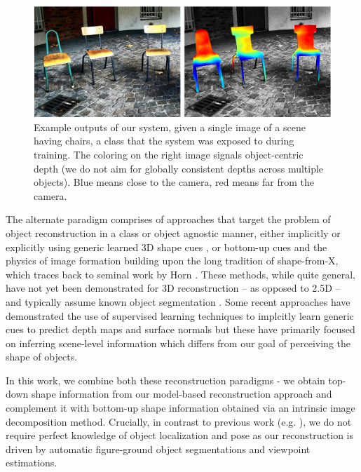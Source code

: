 \begin{figure}[t]
\includegraphics[width = \textwidth]{figures/categoryshapes/teaserChair.pdf}
\caption{Example outputs of our system, given a single image of a scene having chairs, a class that the system was exposed to during training. The coloring on the right image signals object-centric depth (we do not aim for globally consistent depths across multiple objects). Blue means close to the camera, red means far from the camera.}
\end{figure}

The alternate paradigm comprises of approaches that target the problem of object reconstruction in a class or object agnostic manner, either implicitly or explicitly using generic learned 3D shape cues \cite{hoiem2005automatic, saxena2009make3d}, or bottom-up cues and the physics of image formation \cite{Karsch2013,barronPAMI13} building upon the long tradition of shape-from-X, which traces back to seminal work by Horn \cite{HORNThesis1970}. These methods, while quite general, have not yet been demonstrated for 3D reconstruction -- as opposed to 2.5D -- and typically assume known object segmentation \cite{barronPAMI13}. Some recent approaches have demonstrated the use of supervised learning techniques to implcitly learn generic cues to predict depth maps \cite{eigennips14} and surface normals \cite{eigen2015predicting, wang2015designing} but these have primarily focused on  inferring scene-level information which differs from our goal of perceiving the shape of objects.

In this work, we combine both these reconstruction paradigms - we obtain top-down shape information from our model-based reconstruction approach and complement it with bottom-up shape information obtained via an intrinsic image decomposition method.  Crucially, in contrast to previous work (e.g. \cite{barronPAMI13,carvi14,cashman2013dolphins}), we do not require perfect knowledge of object localization and pose as our reconstruction is driven by automatic figure-ground object segmentations and viewpoint estimations.

